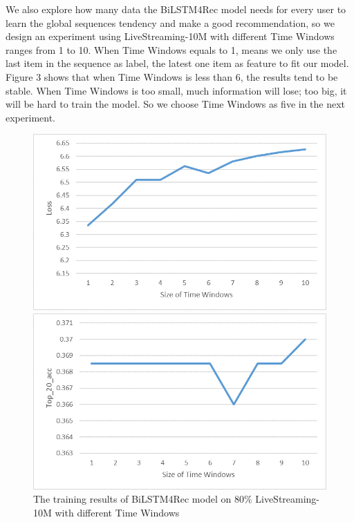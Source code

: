 \documentclass[runningheads]{llncs}
\begin{document}
We also explore how many data the BiLSTM4Rec model needs for every user to learn the global sequences tendency and make a good recommendation, so we design an experiment using LiveStreaming-10M with different Time Windows ranges from 1 to 10. When Time Windows equals to 1, means we only use the last item in the sequence as label, the latest one item as feature to fit our model. Figure 3 shows that when Time Windows is less than 6, the results tend to be stable. When Time Windows is too small, much information will lose; too big, it will be hard to train the model. So we choose Time Windows as five in the next experiment.
\begin{figure}[!htb]
   \begin{minipage}{0.48\textwidth}
     \centering
     \includegraphics[width=\linewidth]{image/Loss_timewindows.png}
   \end{minipage}\hfill
   \begin {minipage}{0.48\textwidth}
     \centering
     \includegraphics[width=\linewidth]{image/Top_20_acc_timewindows.png}
   \end{minipage}
   \caption{The training results of BiLSTM4Rec model on 80\% LiveStreaming-10M with different Time Windows}
\end{figure}
\end{document}

